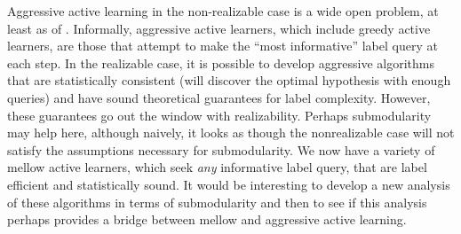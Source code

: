 Aggressive active learning in the non-realizable case is a wide open problem, at least as of \cite{dasgupta2011}. Informally, aggressive active learners, which include greedy active learners, are those that attempt to make the ``most informative'' label query at each step. In the realizable case, it is possible to develop aggressive algorithms that are statistically consistent (will discover the optimal hypothesis with enough queries) and have sound theoretical guarantees for label complexity. However, these guarantees go out the window with realizability. Perhaps submodularity may help here, although naively, it looks as though the nonrealizable case will not satisfy the assumptions necessary for submodularity. We now have a variety of mellow active learners, which seek \textit{any} informative label query, that are label efficient and statistically sound. It would be interesting to develop a new analysis of these algorithms in terms of submodularity and then to see if this analysis perhaps provides a bridge between mellow and aggressive active learning.


